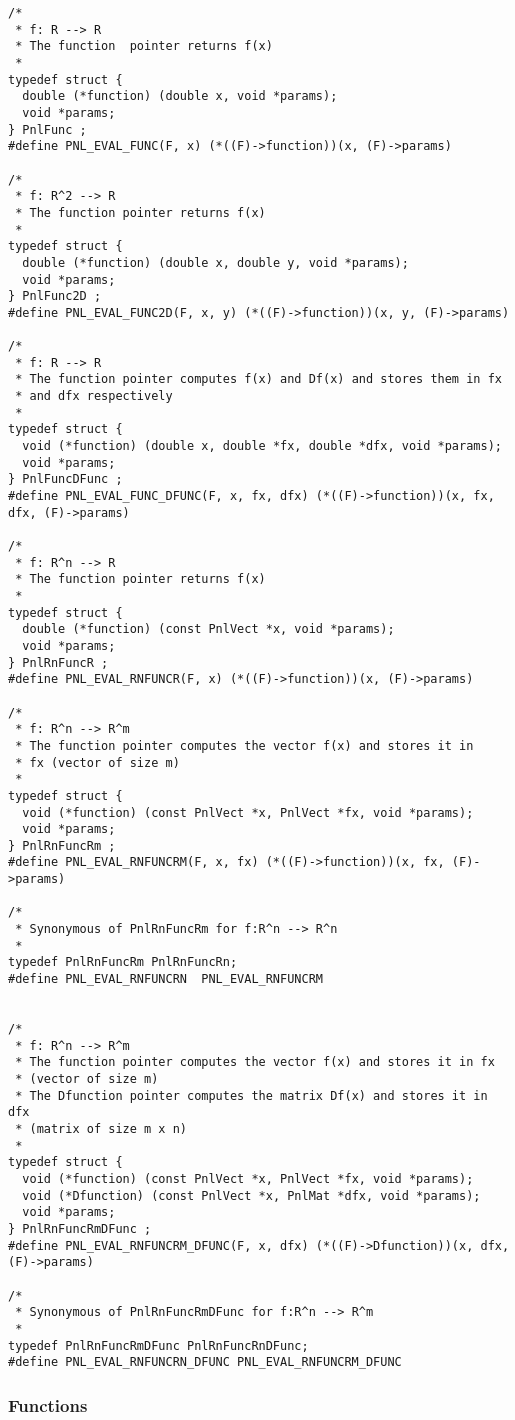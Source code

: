 \begin{verbatim}
/*
 * f: R --> R
 * The function  pointer returns f(x)
 *
typedef struct {
  double (*function) (double x, void *params);
  void *params;
} PnlFunc ;
#define PNL_EVAL_FUNC(F, x) (*((F)->function))(x, (F)->params)

/*
 * f: R^2 --> R
 * The function pointer returns f(x)
 *
typedef struct {
  double (*function) (double x, double y, void *params);
  void *params;
} PnlFunc2D ;
#define PNL_EVAL_FUNC2D(F, x, y) (*((F)->function))(x, y, (F)->params)

/*
 * f: R --> R
 * The function pointer computes f(x) and Df(x) and stores them in fx
 * and dfx respectively
 *
typedef struct {
  void (*function) (double x, double *fx, double *dfx, void *params);
  void *params;
} PnlFuncDFunc ;
#define PNL_EVAL_FUNC_DFUNC(F, x, fx, dfx) (*((F)->function))(x, fx, dfx, (F)->params)

/*
 * f: R^n --> R
 * The function pointer returns f(x)
 *
typedef struct {
  double (*function) (const PnlVect *x, void *params);
  void *params;
} PnlRnFuncR ;
#define PNL_EVAL_RNFUNCR(F, x) (*((F)->function))(x, (F)->params)

/*
 * f: R^n --> R^m
 * The function pointer computes the vector f(x) and stores it in
 * fx (vector of size m)
 *
typedef struct {
  void (*function) (const PnlVect *x, PnlVect *fx, void *params);
  void *params;
} PnlRnFuncRm ;
#define PNL_EVAL_RNFUNCRM(F, x, fx) (*((F)->function))(x, fx, (F)->params)

/*
 * Synonymous of PnlRnFuncRm for f:R^n --> R^n
 *
typedef PnlRnFuncRm PnlRnFuncRn;
#define PNL_EVAL_RNFUNCRN  PNL_EVAL_RNFUNCRM


/*
 * f: R^n --> R^m
 * The function pointer computes the vector f(x) and stores it in fx
 * (vector of size m)
 * The Dfunction pointer computes the matrix Df(x) and stores it in dfx
 * (matrix of size m x n)
 *
typedef struct {
  void (*function) (const PnlVect *x, PnlVect *fx, void *params);
  void (*Dfunction) (const PnlVect *x, PnlMat *dfx, void *params);
  void *params;
} PnlRnFuncRmDFunc ;
#define PNL_EVAL_RNFUNCRM_DFUNC(F, x, dfx) (*((F)->Dfunction))(x, dfx, (F)->params)

/*
 * Synonymous of PnlRnFuncRmDFunc for f:R^n --> R^m
 *
typedef PnlRnFuncRmDFunc PnlRnFuncRnDFunc;
#define PNL_EVAL_RNFUNCRN_DFUNC PNL_EVAL_RNFUNCRM_DFUNC
\end{verbatim}

\subsubsection{Functions}

